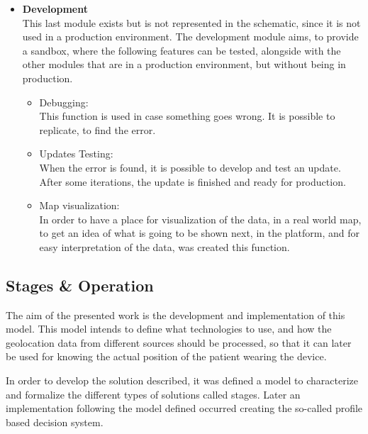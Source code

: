 \begin{itemize}
   \item \textbf{Development}\\
   This last module exists but is not represented in the schematic, since it is not used in a production environment. The development module aims, to provide a sandbox, where the following features can be tested, alongside with the other modules that are in a production environment, but without being in production.
   \begin{itemize}
     \item Debugging:  \\This  function is used in case something goes wrong. It is possible to replicate,  to find the error.
   \end{itemize}
   \begin{itemize}
     \item Updates Testing: \\When the error is found, it is possible to develop and test an update. After some iterations, the update is finished and ready for production. 
   \end{itemize}
   \begin{itemize}
     \item Map visualization: \\ In order to have a place for visualization of the data, in a real world map, to get an idea of what is going to be shown next, in the platform, and for easy interpretation of the data, was created this function.
   \end{itemize}
\end{itemize}









\newpage
\subsection{Stages \& Operation}
\label{susec:Stages_Operation}

The aim of the presented work is the development and implementation of this model. This model intends to define what technologies to use, and how the geolocation data from different sources should be processed, so that it can later be used for knowing the actual position of the patient wearing the device.

In order to develop the solution described, it was defined a model to characterize and formalize the different types of solutions called stages. Later an implementation following the model defined occurred creating the so-called profile based decision system.


